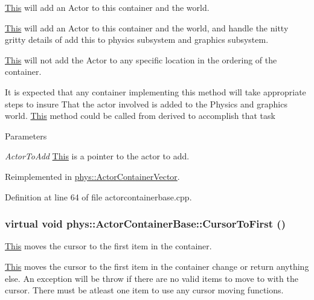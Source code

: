 \hyperlink{structThis}{This} will add an Actor to this container and the world. 

\hyperlink{structThis}{This} will add an Actor to this container and the world, and handle the nitty gritty details of add this to physics subsystem and graphics subsystem. \par
\par
 \hyperlink{structThis}{This} will not add the Actor to any specific location in the ordering of the container. \par
\par
 It is expected that any container implementing this method will take appropriate steps to insure That the actor involved is added to the Physics and graphics world. \hyperlink{structThis}{This} method could be called from derived to accomplish that task 
\begin{DoxyParams}{Parameters}
\item[{\em ActorToAdd}]\hyperlink{structThis}{This} is a pointer to the actor to add. \end{DoxyParams}


Reimplemented in \hyperlink{classphys_1_1ActorContainerVector_a4bc3e38f16caddee021a97739bebaf6e}{phys::ActorContainerVector}.



Definition at line 64 of file actorcontainerbase.cpp.

\hypertarget{classphys_1_1ActorContainerBase_ab1a44758d7c17e70ff2e0f8de47424c3}{
\subsubsection[{CursorToFirst}]{\setlength{\rightskip}{0pt plus 5cm}virtual void phys::ActorContainerBase::CursorToFirst ()}}
\label{d1/d00/classphys_1_1ActorContainerBase_ab1a44758d7c17e70ff2e0f8de47424c3}


\hyperlink{structThis}{This} moves the cursor to the first item in the container. 

\hyperlink{structThis}{This} moves the cursor to the first item in the container change or return anything else. An exception will be throw if there are no valid items to move to with the cursor. There must be atleast one item to use any cursor moving functions. 

